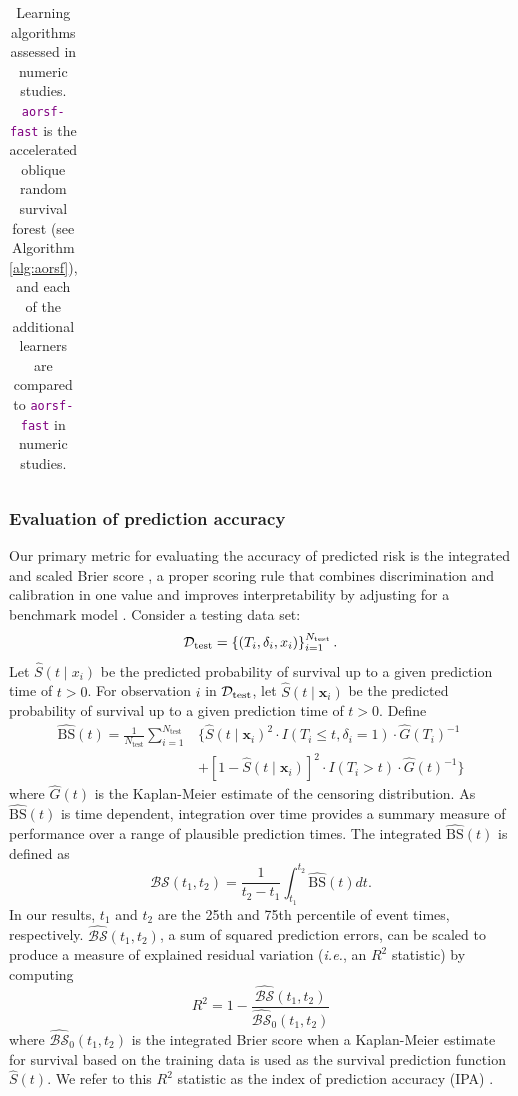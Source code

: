 \documentclass[12pt]{article}\usepackage[]{graphicx}\usepackage[]{xcolor}
\newcommand{\dataset}{{\cal D}}
\newcommand{\ie}{\textit{i.e.}}
\newcommand{\bstat}{\widehat{\text{BS}}(t)}
\newcommand{\bsbar}{\mathcal{\widehat{BS}}(t_1, t_2)}
\newcommand{\bskap}{\mathcal{\widehat{BS}}_0(t_1, t_2)}
\newcommand{\ntest}{N_{\text{test}}}
\begin{document}
\begin{landscape}
\begin{table}[h!]
\begin{tabular}{p{2cm} | p{3cm} p{4cm} p{12cm}}
\end{tabular}
\caption{Learning algorithms assessed in numeric studies. \textcolor{purple}{\texttt{aorsf-fast}} is the accelerated oblique random survival forest (see Algorithm \ref{alg:aorsf}), and each of the additional learners are compared to \textcolor{purple}{\texttt{aorsf-fast}} in numeric studies.}
\label{tab:learners}
\end{table}

\end{landscape}
\restoregeometry
{}


\subsubsection{Evaluation of prediction accuracy} \label{sec:prediction_accuracy}

Our primary metric for evaluating the accuracy of predicted risk is the integrated and scaled Brier score \citep{graf1999assessment}, a proper scoring rule that combines discrimination and calibration in one value and improves interpretability by adjusting for a benchmark model \citep{kattan2018index}. Consider a testing data set:
$$\dataset_{\text{test}} = \left\{ (T_i, \delta_i, x_{i}) \right\}_{i=1}^{N_{\text{test}}}.$$
Let $\widehat{S}(t \mid x_i)$ be the predicted probability of survival up to a given prediction time of $t > 0$.
 For observation $i$ in $\dataset_{\text{test}}$, let $\widehat{S}(t \mid \bm{x}_i)$ be the predicted probability of survival up to a given prediction time of $t > 0$. Define \begin{align*}
\bstat = \frac{1}{\ntest} \sum_{i=1}^{\ntest} &\{ \widehat{S}(t \mid \bm{x}_i)^2 \cdot I(T_i \leq t, \delta_i = 1) \cdot \widehat{G}(T_i)^{-1} \\ &+ [1-\widehat{S}(t \mid \bm{x}_i)]^2 \cdot I(T_i > t) \cdot \widehat{G}(t)^{-1}\}
\end{align*} where $\widehat{G}(t)$ is the Kaplan-Meier estimate of the censoring distribution. As $\bstat$ is time dependent, integration over time provides a summary measure of performance over a range of plausible prediction times. The integrated $\bstat$ is defined as \begin{equation}
\bsbar = \frac{1}{t_2 - t_1}\int_{t_1}^{t_2} \widehat{\text{BS}}(t) dt.
\end{equation} In our results, $t_1$ and $t_2$ are the 25th and 75th percentile of event times, respectively. $\bsbar$, a sum of squared prediction errors, can be scaled to produce a measure of explained residual variation (\ie, an $R^2$ statistic) by computing \begin{equation}
R^2 = 1 - \frac{\bsbar}{\bskap}
\end{equation} where $\bskap$ is the integrated Brier score when a Kaplan-Meier estimate for survival based on the training data is used as the survival prediction function $\widehat{S}(t)$. We refer to this $R^2$ statistic as the index of prediction accuracy (IPA) \citep{kattan2018index}.
\end{document}

